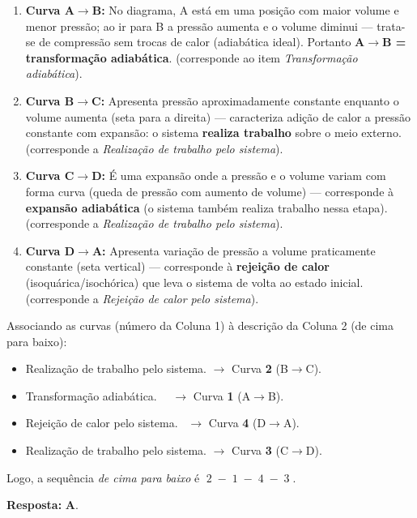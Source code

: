 \begin{flushleft}
\begin{enumerate}
    \item \textbf{Curva A$\to$B:} No diagrama, A est\'a em uma posi\c{c}\~ao com maior volume e menor press\~ao; ao ir para B a press\~ao aumenta e o volume diminui — trata-se de compress\~ao sem trocas de calor (adiab\'atica ideal). Portanto \textbf{A$\to$B = transforma\c{c}\~ao adiab\'atica}. (corresponde ao item \emph{Transformação adiabática}).
    \item \textbf{Curva B$\to$C:} Apresenta press\~ao aproximadamente constante enquanto o volume aumenta (seta para a direita) — caracteriza adi\c{c}\~ao de calor a press\~ao constante com expans\~ao: o sistema \textbf{realiza trabalho} sobre o meio externo. (corresponde a \emph{Realização de trabalho pelo sistema}).
    \item \textbf{Curva C$\to$D:} \'E uma expans\~ao onde a press\~ao e o volume variam com forma curva (queda de press\~ao com aumento de volume) — 
    corresponde \`a \textbf{expans\~ao adiab\'atica} (o sistema tamb\'em realiza trabalho nessa etapa). (corresponde a \emph{Realização de trabalho pelo sistema}).
    \item \textbf{Curva D$\to$A:} Apresenta varia\c{c}\~ao de press\~ao a volume praticamente constante (seta vertical) — corresponde \`a \textbf{rejei\c{c}\~ao de calor} (isoqu\'arica/isoch\'orica) que leva o sistema de volta ao estado inicial. (corresponde a \emph{Rejeição de calor pelo sistema}).
\end{enumerate}

Associando as curvas (n\'umero da Coluna 1) \`a descri\c{c}\~ao da Coluna 2 (de cima para baixo):

\begin{itemize}
    \item Realiza\c{c}\~ao de trabalho pelo sistema. \quad $\to$ Curva \textbf{2} (B$\to$C).
    \item Transformação adiabática. \quad\quad\quad\quad\ \ $\to$ Curva \textbf{1} (A$\to$B).
    \item Rejeição de calor pelo sistema. \quad\quad\ $\to$ Curva \textbf{4} (D$\to$A).
    \item Realiza\c{c}\~ao de trabalho pelo sistema. \quad $\to$ Curva \textbf{3} (C$\to$D).
\end{itemize}

Logo, a sequ\^encia \emph{de cima para baixo} \'e \(\;2\;-\;1\;-\;4\;-\;3\;\).

\vspace{0.3cm}

\textbf{Resposta:} \colorbox{green!50}{\textbf{A}}.

\end{flushleft}



